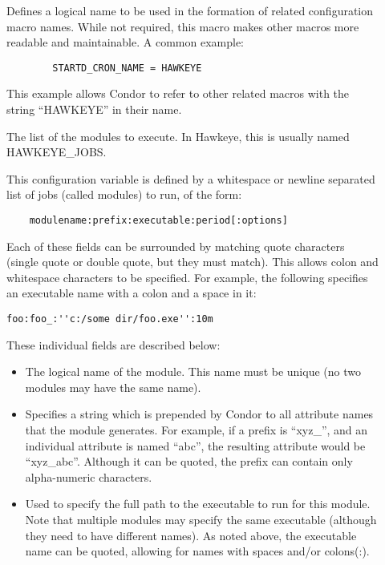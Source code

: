 \begin{description}

\item[]
\label{param:StartdCronName}
  Defines a logical name to be used in the formation of related
  configuration macro names. While
  not required, this macro makes other macros
  more readable and maintainable.  A common example:
\begin{verbatim}
        STARTD_CRON_NAME = HAWKEYE
\end{verbatim}
  This example allows Condor to refer to other related macros
  with the string ``HAWKEYE'' in their name.

\item[]
\label{param:StartdCronJobs}
  The list of the modules to execute.  In Hawkeye, this is usually
  named HAWKEYE\_JOBS.

  This configuration variable is defined by
  a whitespace or newline separated list of jobs (called modules) to run, of the form:
\begin{verbatim}
	modulename:prefix:executable:period[:options]
\end{verbatim}
  Each of these fields can be surrounded by matching quote characters
  (single quote or double quote, but they must match).  This allows
  colon and whitespace characters to be specified.  For example, the
  following specifies an executable name with a colon and a space in it:
  \begin{verbatim}foo:foo_:''c:/some dir/foo.exe'':10m\end{verbatim}
  These individual fields are described below: \begin{itemize}

    \item {} The logical name of the module.  This name
    must be unique (no two modules may have the same name).

    \item {} Specifies a string which is prepended by
    Condor to all attribute names that the module generates.  For
    example, if a prefix is ``xyz\_'', and an individual attribute is
    named ``abc'', the resulting attribute would be ``xyz\_abc''.
    Although it can be quoted, the prefix can contain only
    alpha-numeric characters.

    \item {} Used to specify the full path to the
    executable to run for this module.  Note that multiple modules may
    specify the same executable (although they need to have different
    names).  As noted above, the executable name can be quoted,
    allowing for names with spaces and/or colons(:).


\end{itemize}
\end{description}
